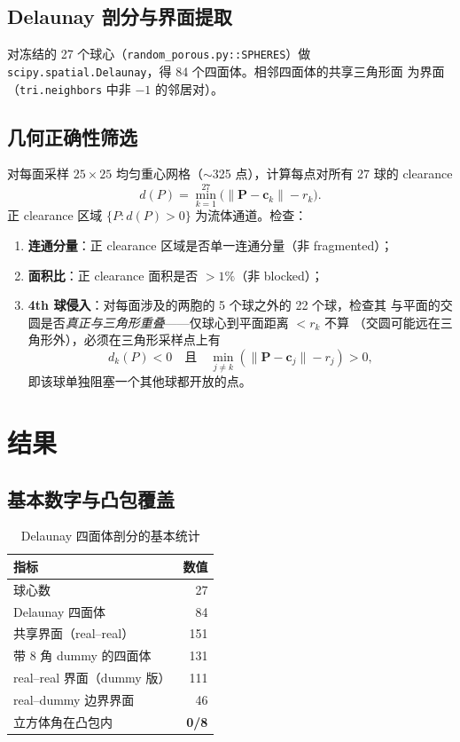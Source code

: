 \documentclass[UTF8,zihao=-4]{ctexart}
\newcommand{\cc}{\bm c}
\begin{document}
\subsection{Delaunay 剖分与界面提取}

对冻结的 27 个球心（\texttt{random\_porous.py::SPHERES}）做
\texttt{scipy.spatial.Delaunay}，得 84 个四面体。相邻四面体的共享三角形面
为界面（\texttt{tri.neighbors} 中非 $-1$ 的邻居对）。

\subsection{几何正确性筛选}

对每面采样 $25\times25$ 均匀重心网格（$\sim$325 点），计算每点对所有 27 球的
clearance
\begin{equation}
  d(P) = \min_{k=1}^{27}\bigl(\|\bm P-\cc_k\| - r_k\bigr).
\end{equation}
正 clearance 区域 $\{P : d(P)>0\}$ 为流体通道。检查：
\begin{enumerate}
  \item \textbf{连通分量}：正 clearance 区域是否单一连通分量（非 fragmented）；
  \item \textbf{面积比}：正 clearance 面积是否 $>1\%$（非 blocked）；
  \item \textbf{4th 球侵入}：对每面涉及的两胞的 5 个球之外的 22 个球，检查其
  与平面的交圆是否\emph{真正与三角形重叠}——仅球心到平面距离 $<r_k$ 不算
  （交圆可能远在三角形外），必须在三角形采样点上有
  \begin{equation}
    d_k(P)<0 \quad\text{且}\quad \min_{j\ne k}(\|\bm P-\cc_j\|-r_j)>0,
  \end{equation}
  即该球单独阻塞一个其他球都开放的点。
\end{enumerate}

\section{结果}

\subsection{基本数字与凸包覆盖}

\begin{table}[htbp]
\centering
\caption{Delaunay 四面体剖分的基本统计}
\label{tab:basic}
\small
\begin{tabular}{lr}
\toprule
指标 & 数值\\
\midrule
球心数 & 27\\
Delaunay 四面体 & 84\\
共享界面（real--real）& 151\\
带 8 角 dummy 的四面体 & 131\\
real--real 界面（dummy 版）& 111\\
real--dummy 边界界面 & 46\\
立方体角在凸包内 & \textbf{0/8}\\
\bottomrule
\end{tabular}
\end{table}
\end{document}
